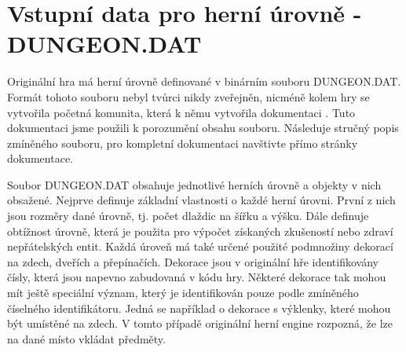 \section{Vstupní data pro herní úrovně - DUNGEON.DAT}
Originální hra má herní úrovně definované v binárním souboru DUNGEON.DAT. Formát tohoto souboru nebyl tvůrci nikdy zveřejněn,
nicméně kolem hry se vytvořila početná komunita, která k němu vytvořila dokumentaci .
Tuto dokumentaci jsme použili k porozumění obsahu souboru. Následuje stručný popis zmíněného souboru, pro 
kompletní dokumentaci navštivte přímo stránky dokumentace.

Soubor DUNGEON.DAT obsahuje jednotlivé herních úrovně a objekty v nich obsažené. Nejprve definuje základní 
vlastnosti o každé herní úrovni. První z nich jsou rozměry dané úrovně, tj. počet dlaždic na šířku a výšku. Dále
definuje obtížnost úrovně, která je použita pro výpočet získaných zkušeností nebo zdraví nepřátelských entit. Každá úroveň má
také určené použité podmnožiny dekorací na zdech, dveřích a přepínačích. Dekorace jsou v originální hře identifikovány čísly, která
jsou napevno zabudovaná v kódu hry. Některé dekorace tak mohou mít ještě speciální význam, který je identifikován
pouze podle zmíněného číselného identifikátoru. Jedná se například o dekorace s výklenky, které mohou být umístěné na zdech.
V tomto případě originální herní engine rozpozná, že lze na dané místo vkládat předměty.

